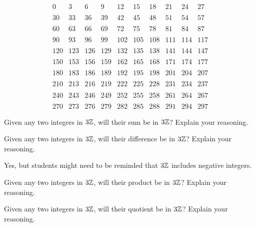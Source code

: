 \[
\begin{array}{cccccccccc}
0   & 3   & 6   & 9   & 12  & 15  & 18  & 21  & 24  & 27  \\
\\
30  & 33  & 36  & 39  & 42  & 45  & 48  & 51  & 54  & 57  \\
\\
60  & 63  & 66  & 69  & 72  & 75  & 78  & 81  & 84  & 87  \\
\\
90  & 93  & 96  & 99  & 102 & 105 & 108 & 111 & 114 & 117 \\
\\
120 & 123 & 126 & 129 & 132 & 135 & 138 & 141 & 144 & 147 \\
\\
150 & 153 & 156 & 159 & 162 & 165 & 168 & 171 & 174 & 177 \\
\\
180 & 183 & 186 & 189 & 192 & 195 & 198 & 201 & 204 & 207 \\
\\
210 & 213 & 216 & 219 & 222 & 225 & 228 & 231 & 234 & 237 \\
\\
240 & 243 & 246 & 249 & 252 & 255 & 258 & 261 & 264 & 267 \\
\\
270 & 273 & 276 & 279 & 282 & 285 & 288 & 291 & 294 & 297
\end{array}
\]



\begin{prob}
Given any two integers in $3\mathbb Z$, will their sum be in $3\mathbb Z$? Explain
your reasoning.
\end{prob}

\begin{prob}
Given any two integers in $3\mathbb Z$, will their difference be in $3\mathbb Z$?
Explain your reasoning.
\end{prob}
\begin{teachingnote}
Yes, but students might need to be reminded that $3\mathbb Z$ includes negative integers.  
\end{teachingnote}

\begin{prob}
Given any two integers in $3\mathbb Z$, will their product be in $3\mathbb Z$?
Explain your reasoning.
\end{prob}

\begin{prob}
Given any two integers in $3\mathbb Z$, will their quotient be in $3\mathbb Z$?
Explain your reasoning.
\end{prob}

